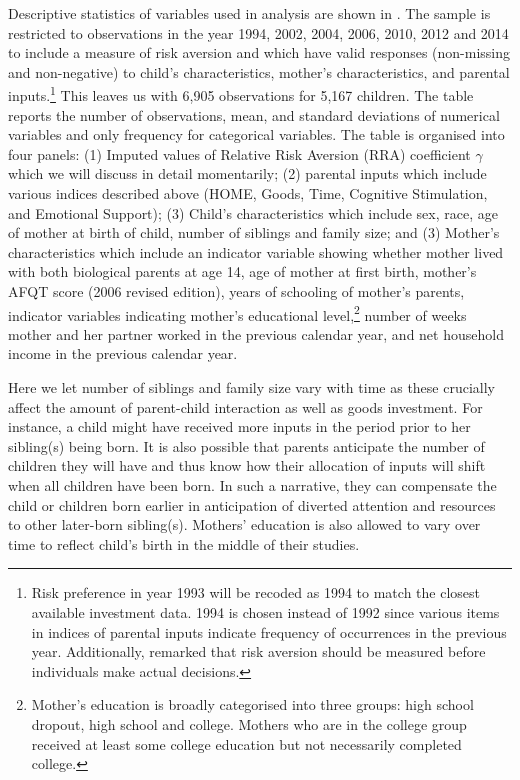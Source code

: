 \documentclass[emulatestandardclasses, 10pt, abstract = true]{scrartcl}
\begin{document}
Descriptive statistics of variables used in analysis are shown in . The sample is restricted to observations in the year 1994, 2002, 2004, 2006, 2010, 2012 and 2014 to include a measure of risk aversion and which have valid responses (non-missing and non-negative) to child's characteristics, mother's characteristics, and parental inputs.\footnote{Risk preference in year 1993 will be recoded as 1994 to match the closest available investment data. 1994 is chosen instead of 1992 since various items in indices of parental inputs indicate frequency of occurrences in the previous year. Additionally, \citet{hartog2002linking} remarked that risk aversion should be measured before individuals make actual decisions.} This leaves us with 6,905 observations for 5,167 children. The table reports the number of observations, mean, and standard deviations of numerical variables and only frequency for categorical variables. The table is organised into four panels: (1) Imputed values of Relative Risk Aversion (RRA) coefficient $\gamma$ which we will discuss in detail momentarily; (2) parental inputs which include various indices described above (HOME, Goods, Time, Cognitive Stimulation, and Emotional Support); (3) Child's characteristics which include sex, race, age of mother at birth of child, number of siblings and family size; and (3) Mother's characteristics which include an indicator variable showing whether mother lived with both biological parents at age 14, age of mother at first birth, mother's AFQT score (2006 revised edition), years of schooling of mother's parents, indicator variables indicating mother's educational level,\footnote{Mother's education is broadly categorised into three groups: high school dropout, high school and college. Mothers who are in the college group received at least some college education but not necessarily completed college.} number of weeks mother and her partner worked in the previous calendar year, and net household income in the previous calendar year. 

Here we let number of siblings and family size vary with time as these crucially affect the amount of parent-child interaction as well as goods investment. For instance, a child might have received more inputs in the period prior to her sibling(s) being born. It is also possible that parents anticipate the number of children they will have and thus know how their allocation of inputs will shift when all children have been born. In such a narrative, they can compensate the child or children born earlier in anticipation of diverted attention and resources to other later-born sibling(s). Mothers' education is also allowed to vary over time to reflect child's birth in the middle of their studies. 
\end{document}
